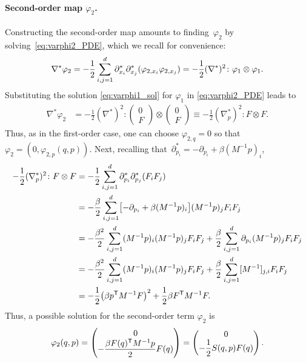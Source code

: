 \documentclass[11pt]{article}
\renewcommand{\t}{\mathsf T}
\DeclarePairedDelimiter\paren{\lparen}{\rparen}
\DeclarePairedDelimiter\bkt{\lbrack}{\rbrack}
\theoremstyle{definition}
\let\oldparagraph=\paragraph
\renewcommand\paragraph[1]{\oldparagraph{#1.}}
\begin{document}
\paragraph{Second-order map $\varphi_2$} Constructing the second-order map amounts to finding~$\varphi_2$ by solving~\eqref{eq:varphi2_PDE}, which we recall for convenience:
\begin{equation}
\notag
	\nabla^*\varphi_2 = -\frac{1}{2}\sum_{i,j=1}^d \partial_{x_i}^*\partial_{x_j}^* (\varphi_{2,x_i}\varphi_{2,x_j}) = -\frac{1}{2}(\nabla^*)^2 \colon \varphi_1\otimes \varphi_1.
\end{equation}
Substituting the solution \eqref{eq:varphi1_sol} for $\varphi_1$ in \eqref{eq:varphi2_PDE} leads to
\begin{align*}
    \nabla^*\varphi_2 &= -\frac{1}{2}(\nabla^*)^2\colon 
    \begin{pmatrix}
        0 \\ F    
    \end{pmatrix} \otimes 
    \begin{pmatrix}
        0 \\ F    
    \end{pmatrix} \equiv -\frac{1}{2}(\nabla_p^*)^2 \colon F\otimes F.
\end{align*}
Thus, as in the first-order case, one can choose $\varphi_{2,q} = 0$ so that $\varphi_2 = (0, \varphi_{2,p}(q,p))$. Next, recalling that~$\partial^*_{p_i} = -\partial_{p_i} + \beta (M^{-1}p)_i$,
\begin{align*}
    -\frac{1}{2}(\nabla_p^*)^2 \colon F\otimes F &= -\frac{1}{2}\sum_{i,j=1}^d \partial_{p_i}^*\partial_{p_j}^* \paren*{F_i F_j} \\
    &= -\frac{\beta}{2}\sum_{i,j=1}^d \bkt*{-\partial_{p_i} + \beta (M^{-1}p)_i}(M^{-1}p)_j F_i F_j \\
    &= -\frac{\beta^2}{2}\sum_{i,j=1}^d (M^{-1}p)_i(M^{-1}p)_j F_i F_j + \frac{\beta}{2} \sum_{i,j=1}^d \partial_{p_i}(M^{-1}p)_j F_iF_j \\
    &= -\frac{\beta^2}{2}\sum_{i,j=1}^d (M^{-1}p)_i(M^{-1}p)_j F_i F_j +\frac{\beta}{2}\sum_{i,j=1}^d [M^{-1}]_{j,i} F_i F_j \\
    &= -\frac{1}{2}\paren*{\beta p^\t M^{-1}F}^2 + \frac{1}{2}\beta F^\t M^{-1}F.
\end{align*}
Thus, a possible solution for the second-order term $\varphi_2$ is
\begin{equation}
\notag
    \varphi_2(q,p) = 
    \begin{pmatrix}
        0 \\ -\dfrac{\beta F(q)^\t M^{-1} p}{2}F(q)
    \end{pmatrix} = 
    \begin{pmatrix}
        0 \\ -\dfrac{1}{2}S(q,p)F(q)
    \end{pmatrix}.
\end{equation}
\end{document}
